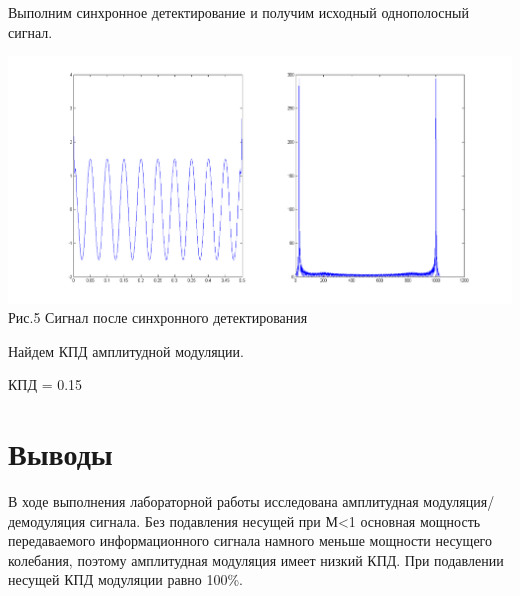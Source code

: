 \documentclass[a4paper]{article}
\begin{document}
Выполним синхронное детектирование и получим исходный однополосный сигнал.
 
 \begin{center}
 	\includegraphics[scale = 0.4]{demod.png} \\Рис.5 Сигнал после синхронного детектирования
 \end{center}

Найдем КПД амплитудной модуляции.


КПД = 0.15

\section{Выводы}
В ходе выполнения лабораторной работы исследована амплитудная модуляция/демодуляция сигнала. Без подавления несущей при М<1 основная мощность передаваемого информационного сигнала намного меньше мощности несущего колебания, поэтому амплитудная модуляция имеет низкий КПД. При подавлении несущей КПД модуляции равно 100\%.
\end{document}
